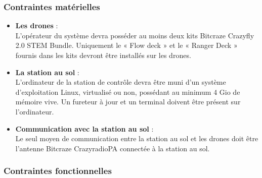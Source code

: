 \documentclass{mistcoursedoc}
\begin{document}
\subsubsection{Contraintes matérielles}
\begin{itemize}

  \item \textbf{Les drones} : \\
        L’opérateur du système devra posséder au moins deux kits Bitcraze Crazyfly 2.0 STEM Bundle.
        Uniquement le « Flow deck » et le « Ranger Deck » fournis dans les kits devront être installés sur les drones.

  \item \textbf{La station au sol} : \\
        L’ordinateur de la station de contrôle devra être muni d’un système d’exploitation
        Linux, virtualisé ou non, possédant au minimum 4 Gio de mémoire vive.
        Un fureteur à jour et un terminal doivent être présent sur l’ordinateur.

  \item \textbf{Communication avec la station au sol} : \\
        Le seul moyen de communication entre la station au sol et les drones doit être
        l’antenne Bitcraze CrazyradioPA connectée à la station au sol.

\end{itemize}

\subsubsection{Contraintes fonctionnelles}
\end{document}
